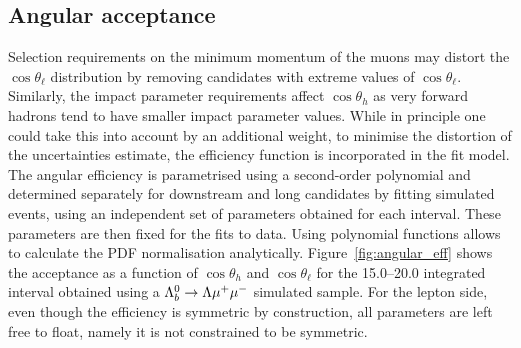 

\subsection{Angular acceptance}
\label{sec:AngEff}

Selection requirements on the minimum momentum of the muons may distort the $\cos\theta_\ell$ 
distribution by removing candidates with extreme values of $\cos\theta_\ell$. Similarly, 
the impact parameter requirements affect $\cos\theta_h$ as very forward hadrons tend
to have smaller impact parameter values. While in principle one could take this into account
by an additional weight, to minimise the distortion of the uncertainties estimate,
the efficiency function is incorporated in the fit model. The angular efficiency is
parametrised using a second-order polynomial and determined separately for downstream and
long candidates by fitting simulated events, using an independent set of parameters obtained
for each \qsq interval. These parameters are then fixed for the fits to data.
Using polynomial functions allows to calculate the PDF normalisation analytically.
Figure~\ref{fig:angular_eff} shows the acceptance as a function of $\cos\theta_h$ and 
$\cos\theta_\ell$ for the 15.0--20.0 integrated \qsq interval obtained using a $\Lambda^0_b\rightarrow\Lambda\mu^+\mu^-$ simulated sample.
%
For the lepton side, even though the efficiency is symmetric by construction,
all parameters are left free to float, namely it is not constrained to be symmetric.


